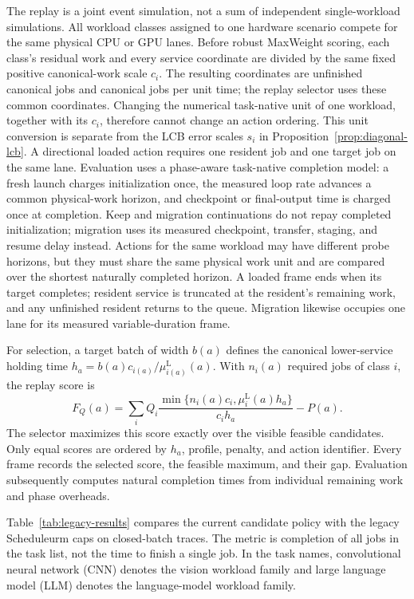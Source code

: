 \documentclass[opre,dblanonrev]{informs4}
\newcommand{\lowermu}{\mu^{\mathrm L}}
\begin{document}
The replay is a joint event simulation, not a sum of independent
single-workload simulations.  All workload classes assigned to one hardware
scenario compete for the same physical CPU or GPU lanes.  Before robust
MaxWeight scoring, each class's residual work and every service coordinate are
divided by the same fixed positive canonical-work scale \(c_i\).  The resulting
coordinates are unfinished canonical jobs and canonical jobs per unit time;
the replay selector uses these common coordinates.
Changing the numerical task-native unit of one workload, together with its
\(c_i\), therefore cannot change an action ordering.  This unit conversion is
separate from the LCB error scales \(s_i\) in
Proposition~\ref{prop:diagonal-lcb}.  A directional loaded action
requires one resident job and one target job on the same lane.  Evaluation uses
a phase-aware task-native completion model: a fresh launch charges initialization
once, the measured loop rate advances a common physical-work horizon, and
checkpoint or final-output time is charged once at completion.  Keep and
migration continuations do not repay completed initialization; migration uses
its measured checkpoint, transfer, staging, and resume delay instead.  Actions
for the same workload may have different probe horizons, but they must share the
same physical work unit and are compared over the shortest naturally completed
horizon.  A loaded frame ends when its target completes; resident service is
truncated at the resident's remaining work, and any unfinished resident returns
to the queue.  Migration likewise occupies one lane for its measured
variable-duration frame.

For selection, a target batch of width \(b(a)\) defines the canonical lower-service
holding time \(h_a=b(a)c_{i(a)}/\lowermu_{i(a)}(a)\).  With \(n_i(a)\)
required jobs of class \(i\), the replay score is
\begin{equation}
 F_Q(a)=\sum_i Q_i
 \frac{\min\{n_i(a)c_i,\lowermu_i(a)h_a\}}{c_i h_a}-P(a).
 \label{eq:replay-frame-proxy}
\end{equation}
The selector maximizes this score exactly over the visible feasible candidates.
Only equal scores are ordered by \(h_a\), profile, penalty, and action identifier.
Every frame records the selected score, the feasible maximum, and their gap.
Evaluation subsequently computes natural completion times from individual
remaining work and phase overheads.

Table~\ref{tab:legacy-results} compares the current candidate policy with the
legacy Scheduleurm caps on \UnifiedStaticComparisonCount{} closed-batch traces.
The metric is completion of all jobs in the task list, not the time to finish a
single job.  In the task names, convolutional neural network (CNN) denotes the
vision workload family and large language model (LLM) denotes the
language-model workload family.
\end{document}
